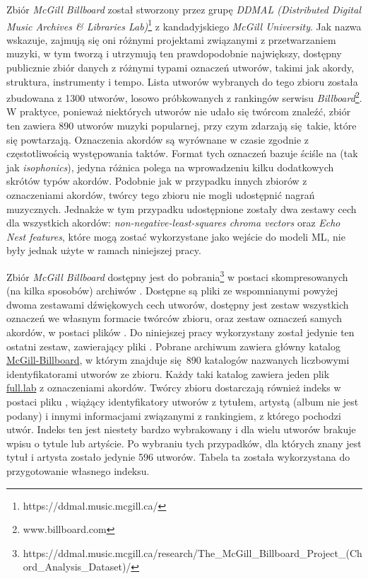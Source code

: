Zbiór \emph{McGill Billboard} \cite{burgoyne_expert_2011} został stworzony przez grupę \emph{DDMAL
(Distributed Digital Music Archives \& Libraries Lab)}\footnote{https://ddmal.music.mcgill.ca/} z
kandadyjskiego \emph{McGill University}. Jak nazwa wskazuje, zajmują się oni różnymi projektami
związanymi z przetwarzaniem muzyki, w tym tworzą i utrzymują ten prawdopodobnie największy, dostępny
publicznie zbiór danych z różnymi typami oznaczeń utworów, takimi jak akordy, struktura, instrumenty
i tempo. Lista utworów wybranych do tego zbioru została zbudowana z 1300 utworów, losowo
próbkowanych z rankingów serwisu \emph{Billboard}\footnote{www.billboard.com}. W praktyce, ponieważ
niektórych utworów nie udało się twórcom znaleźć, zbiór ten zawiera 890 utworów muzyki popularnej,
przy czym zdarzają się takie, które się powtarzają. Oznaczenia akordów są wyrównane w czasie zgodnie
z częstotliwością występowania taktów. Format tych oznaczeń bazuje ściśle na
\cite{harte_towards_nodate} (tak jak \emph{isophonics}), jedyna różnica polega na wprowadzeniu kilku
dodatkowych skrótów typów akordów.  Podobnie jak w przypadku innych zbiorów z oznaczeniami akordów,
twórcy tego zbioru nie mogli udostępnić nagrań muzycznych. Jednakże w tym przypadku udostępnione
zostały dwa zestawy cech dla wszystkich akordów: \emph{non-negative-least-squares chroma vectors}
oraz \emph{Echo Nest features}, które mogą zostać wykorzystane jako wejście do modeli ML, nie były
jednak użyte w ramach niniejszej pracy.

Zbiór \emph{McGill Billboard} dostępny jest do
pobrania\footnote{https://ddmal.music.mcgill.ca/research/The\_McGill\_Billboard\_Project\_(Chord\_Analysis\_Dataset)/}
w postaci skompresowanych (na kilka sposobów) archiwów . Dostępne są pliki ze wspomnianymi
powyżej dwoma zestawami dźwiękowych cech utworów, dostępny jest zestaw wszystkich oznaczeń we
własnym formacie twórców zbioru, oraz zestaw oznaczeń samych akordów, w postaci plików .
Do niniejszej pracy wykorzystany został jedynie ten ostatni zestaw, zawierający pliki . Pobrane
archiwum zawiera główny katalog \url{McGill-Billboard}, w którym znajduje się 890 katalogów nazwanych
liczbowymi identyfikatorami utworów ze zbioru. Każdy taki katalog zawiera jeden plik \url{full.lab} z
oznaczeniami akordów. Twórcy zbioru dostarczają również indeks w postaci pliku , wiążący
identyfikatory utworów z tytułem, artystą (album nie jest podany) i innymi informacjami związanymi z
rankingiem, z którego pochodzi utwór. Indeks ten jest niestety bardzo wybrakowany i dla wielu
utworów brakuje wpisu o tytule lub artyście. Po wybraniu tych przypadków, dla których znany jest
tytuł i artysta zostało jedynie 596 utworów. Tabela ta została wykorzystana do przygotowanie
własnego indeksu.

